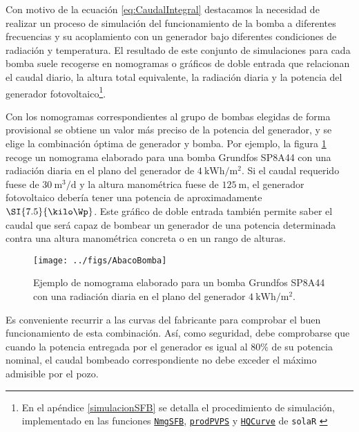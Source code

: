 Con motivo de la ecuación \ref{eq:CaudalIntegral} destacamos la
necesidad de realizar un proceso de simulación del funcionamiento de
la bomba a diferentes frecuencias y su acoplamiento con un generador
bajo diferentes condiciones de radiación y temperatura. El resultado
de este conjunto de simulaciones para cada bomba suele recogerse en
nomogramas o gráficos de doble entrada que relacionan el caudal
diario, la altura total equivalente, la radiación diaria y la potencia
del generador fotovoltaico\footnote{En el apéndice \ref{simulacionSFB}
  se detalla el procedimiento de simulación, implementado en las funciones
\href{http://search.r-project.org/R/library/solaR/html/NmgPVPS.html}{\texttt{NmgSFB}},
\href{http://search.r-project.org/R/library/solaR/html/prodPVPS.html}{\texttt{prodPVPS}} y
\href{http://search.r-project.org/R/library/solaR/html/HQCurve.html}{\texttt{HQCurve}}
de \texttt{solaR} \cite{Perpinan2012b}}.

Con los nomogramas correspondientes al grupo de bombas elegidas de
forma provisional se obtiene un valor más preciso de la potencia del
generador, y se elige la combinación óptima de generador y bomba. Por
ejemplo, la figura \ref{fig:Ejemplo-de-nomograma} recoge un nomograma
elaborado para una bomba Grundfos SP8A44 con una radiación diaria en
el plano del generador de
$\SI{4}{\kWh\per\meter\squared}$.  Si el caudal requerido
fuese de $\SI{30}{\meter\cubed\per\day}$ y la altura manométrica fuese
de $\SI{125}{\meter}$, el generador fotovoltaico debería tener una
potencia de aproximadamente $\SI{7.5}{\kilo\Wp}$.  Este gráfico
de doble entrada también permite saber el caudal que será capaz de
bombear un generador de una potencia determinada contra una altura
manométrica concreta o en un rango de alturas.

%
\begin{figure}
  \texttt{[image: ../figs/AbacoBomba]}

  \caption[Ejemplo de nomograma para sistemas de bombeo.]{Ejemplo de
    nomograma elaborado para un bomba Grundfos SP8A44 con una
    radiación diaria en el plano del generador
    $\SI{4}{\kWh\per\meter\squared}$.\label{fig:Ejemplo-de-nomograma}
  }



\end{figure}

Es conveniente recurrir a las curvas del fabricante para comprobar el
buen funcionamiento de esta combinación. Así, como seguridad, debe
comprobarse que cuando la potencia entregada por el generador es igual
al 80\% de su potencia nominal, el caudal bombeado correspondiente no
debe exceder el máximo admisible por el pozo.

